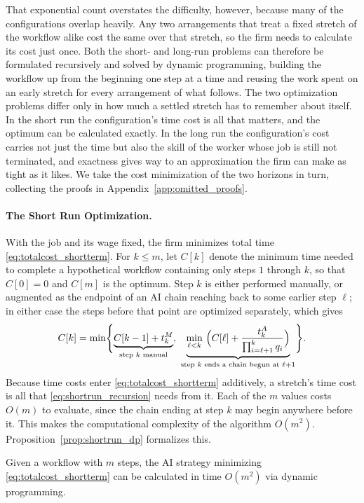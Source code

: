 That exponential count overstates the difficulty, however, because many of the configurations overlap heavily.
Any two arrangements that treat a fixed stretch of the workflow alike cost the same over that stretch, so the firm needs to calculate its cost just once.
Both the short- and long-run problems can therefore be formulated recursively and solved by dynamic programming, building the workflow up from the beginning one step at a time and reusing the work spent on an early stretch for every arrangement of what follows.
The two optimization problems differ only in how much a settled stretch has to remember about itself.
In the short run the configuration's time cost is all that matters, and the optimum can be calculated exactly.
In the long run the configuration's cost carries not just the time but also the skill of the worker whose job is still not terminated, and exactness gives way to an approximation the firm can make as tight as it likes.
We take the cost minimization of the two horizons in turn, collecting the proofs in Appendix~\ref{app:omitted_proofs}.

\paragraph{The Short Run Optimization.}
With the job and its wage fixed, the firm minimizes total time \eqref{eq:totalcost_shortterm}.
For $k \leq m$, let $C[k]$ denote the minimum time needed to complete a hypothetical workflow containing only steps $1$ through $k$, so that $C[0] = 0$ and $C[m]$ is the optimum.
Step $k$ is either performed manually, or augmented as the endpoint of an AI chain reaching back to some earlier step $\ell$; in either case the steps before that point are optimized separately, which gives
\begin{align}
\label{eq:shortrun_recursion}
C[k] = \min\Biggl\{ \underbrace{C[k-1] + t^{M}_{k}}_{\text{step $k$ manual}}, \ \underbrace{\min_{\ell < k}\ \Bigl( C[\ell] + \frac{t^{A}_{k}}{\prod_{i=\ell+1}^{k} q_i} \Bigr)}_{\text{step $k$ ends a chain begun at } \ell+1} \Biggr\}.
\end{align}
Because time costs enter \eqref{eq:totalcost_shortterm} additively, a stretch's time cost is all that \eqref{eq:shortrun_recursion} needs from it.
Each of the $m$ values costs $O(m)$ to evaluate, since the chain ending at step $k$ may begin anywhere before it.
This makes the computational complexity of the algorithm $O(m^2)$.
Proposition~\ref{prop:shortrun_dp} formalizes this.
\begin{proposition}
\label{prop:shortrun_dp}
Given a workflow with $m$ steps, the AI strategy minimizing \eqref{eq:totalcost_shortterm} can be calculated in time $O(m^2)$ via dynamic programming.
\end{proposition}


